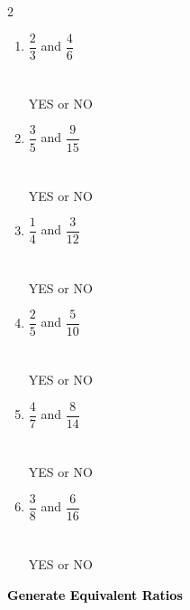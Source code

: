 \documentclass[12pt, letterpaper, fleqn]{article}
\begin{document}
\begin{multicols}{2}
\begin{enumerate}[itemsep=1.2cm, leftmargin=0.6cm]

\item $\dfrac{2}{3}$ and $\dfrac{4}{6}$\\ \\ \\
YES \quad or \quad NO

\vspace{0.7cm}

\item $\dfrac{3}{5}$ and $\dfrac{9}{15}$\\ \\ \\
YES \quad or \quad NO
\vspace{0.7cm}

\item $\dfrac{1}{4}$ and $\dfrac{3}{12}$\\ \\ \\
YES \quad or \quad NO
\vspace{0.7cm}

\item $\dfrac{2}{5}$ and $\dfrac{5}{10}$\\ \\ \\
YES \quad or \quad NO
\vspace{0.45cm}

\item $\dfrac{4}{7}$ and $\dfrac{8}{14}$\\ \\ \\
YES \quad or \quad NO
\vspace{0.5cm}

\item $\dfrac{3}{8}$ and $\dfrac{6}{16}$\\ \\ \\
YES \quad or \quad NO
\vspace{0.7cm}
\end{enumerate}
\end{multicols}

\newpage

\begin{tcolorbox}[colback=customteal!20]
\large\textcolor{black}{\textbf{Generate Equivalent Ratios}}
\end{tcolorbox}
\end{document}
